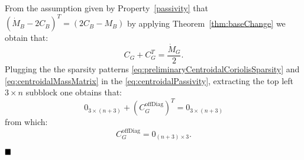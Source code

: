 \begin{enumerate}
From the assumption given by Property~\ref{passivity} that $(\dot{M}_B - 2C_B)^T = (2C_B - M_B)$ by applying Theorem~\ref{thm:baseChange} we obtain that:
\begin{equation} 
\label{eq:centroidalPassivity}
C_G + C_G^T = \frac{\dot{M}_G}{2} .
\end{equation}
Plugging the the sparsity patterns \eqref{eq:preliminaryCentroidalCoriolisSparsity} and \eqref{eq:centroidalMassMatrix} in the \eqref{eq:centroidalPassivity}, extracting the top left $3 \times n$ subblock one obtains that:
$$
  0_{3 \times (n+3)} + \left( C_{G}^{\text{offDiag}} \right)^T = 0_{3 \times (n+3)}
$$
from which: 
$$
C_{G}^{\text{offDiag}} = 0_{(n+3) \times 3}.
$$
\end{enumerate}
$\hfill\blacksquare$
